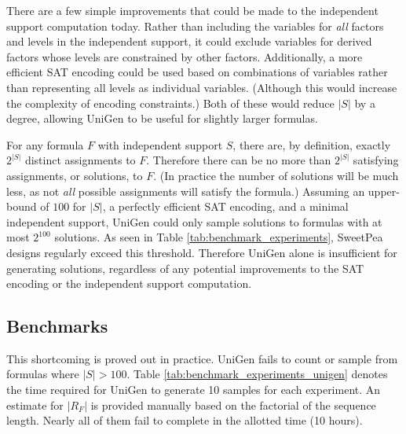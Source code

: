 There are a few simple improvements that could be made to the independent support computation today. Rather than including the variables for \textit{all} factors and levels in the independent support, it could exclude variables for derived factors whose levels are constrained by other factors. Additionally, a more efficient SAT encoding could be used based on combinations of variables rather than representing all levels as individual variables. (Although this would increase the complexity of encoding constraints.) Both of these would reduce $|S|$ by a degree, allowing UniGen to be useful for slightly larger formulas.

For any formula $F$ with independent support $S$, there are, by definition, exactly $2^{|S|}$ distinct assignments to $F$. Therefore there can be no more than $2^{|S|}$ satisfying assignments, or solutions, to $F$. (In practice the number of solutions will be much less, as not \textit{all} possible assignments will satisfy the formula.) Assuming an upper-bound of $100$ for $|S|$, a perfectly efficient SAT encoding, and a minimal independent support, UniGen could only sample solutions to formulas with at most $2^{100}$ solutions. As seen in Table \ref{tab:benchmark_experiments}, SweetPea designs regularly exceed this threshold. Therefore UniGen alone is insufficient for generating solutions, regardless of any potential improvements to the SAT encoding or the independent support computation.

\subsection{Benchmarks}

This shortcoming is proved out in practice. UniGen fails to count or sample from formulas where $|S| > 100$. Table \ref{tab:benchmark_experiments_unigen} denotes the time required for UniGen to generate 10 samples for each experiment. An estimate for $|R_F|$ is provided manually based on the factorial of the sequence length. Nearly all of them fail to complete in the allotted time (10 hours).


